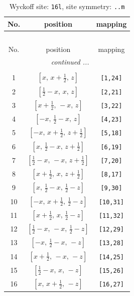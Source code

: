 \documentclass[fleqn,8pt]{jsarticle}
\begin{document}
\renewcommand{\arraystretch}{1.2}
\begin{longtable}{ccc}
\caption{Wyckoff site: {\tt 16l}, site symmetry: {\tt ..m}}
 \\
 \hline \hline
No. & position & mapping \\ \hline \endfirsthead

\multicolumn{2}{l}{\tablename\ \thetable{}} \\
 \hline \hline
No. & position & mapping \\ \hline \endhead

 \hline \hline
\multicolumn{2}{r}{\footnotesize\it continued ...} \\ \endfoot

 \hline \hline
\multicolumn{2}{r}{} \\ \endlastfoot

1 & $\left[ x,\, x + \frac{1}{2},\, z \right]$ & {\tt [1,24]} \\ \hline
2 & $\left[ \frac{1}{2} - x,\, x,\, z \right]$ & {\tt [2,21]} \\ \hline
3 & $\left[ x + \frac{1}{2},\, - x,\, z \right]$ & {\tt [3,22]} \\ \hline
4 & $\left[ - x,\, \frac{1}{2} - x,\, z \right]$ & {\tt [4,23]} \\ \hline
5 & $\left[ - x,\, x + \frac{1}{2},\, z + \frac{1}{2} \right]$ & {\tt [5,18]} \\ \hline
6 & $\left[ x,\, \frac{1}{2} - x,\, z + \frac{1}{2} \right]$ & {\tt [6,19]} \\ \hline
7 & $\left[ \frac{1}{2} - x,\, - x,\, z + \frac{1}{2} \right]$ & {\tt [7,20]} \\ \hline
8 & $\left[ x + \frac{1}{2},\, x,\, z + \frac{1}{2} \right]$ & {\tt [8,17]} \\ \hline
9 & $\left[ x,\, \frac{1}{2} - x,\, \frac{1}{2} - z \right]$ & {\tt [9,30]} \\ \hline
10 & $\left[ - x,\, x + \frac{1}{2},\, \frac{1}{2} - z \right]$ & {\tt [10,31]} \\ \hline
11 & $\left[ x + \frac{1}{2},\, x,\, \frac{1}{2} - z \right]$ & {\tt [11,32]} \\ \hline
12 & $\left[ \frac{1}{2} - x,\, - x,\, \frac{1}{2} - z \right]$ & {\tt [12,29]} \\ \hline
13 & $\left[ - x,\, \frac{1}{2} - x,\, - z \right]$ & {\tt [13,28]} \\ \hline
14 & $\left[ x + \frac{1}{2},\, - x,\, - z \right]$ & {\tt [14,25]} \\ \hline
15 & $\left[ \frac{1}{2} - x,\, x,\, - z \right]$ & {\tt [15,26]} \\ \hline
16 & $\left[ x,\, x + \frac{1}{2},\, - z \right]$ & {\tt [16,27]} \\
\end{longtable}
\end{document}
